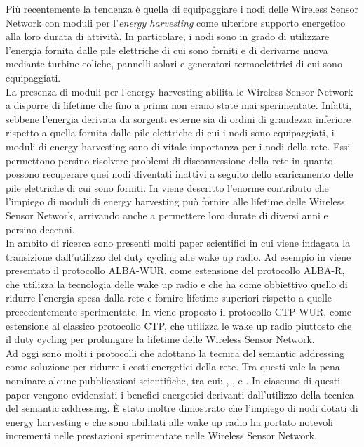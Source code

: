 \documentclass[binding=0.6cm,TFA]{sapthesis}
\begin{document}
Più recentemente la tendenza è quella di equipaggiare i nodi delle Wireless Sensor Network con moduli per l'\emph{energy harvesting} come ulteriore
supporto energetico alla loro durata di attività. In particolare, i nodi sono in grado di utilizzare l'energia fornita dalle pile elettriche di cui sono
forniti e di derivarne nuova mediante turbine eoliche, pannelli solari e generatori termoelettrici di cui sono equipaggiati.\\

\newpage
La presenza di moduli per l'energy harvesting abilita le Wireless Sensor Network a disporre di lifetime che fino a prima non erano state mai sperimentate.
Infatti, sebbene l'energia derivata da sorgenti esterne sia di ordini di grandezza inferiore rispetto a quella fornita dalle pile elettriche di cui i nodi sono
equipaggiati, i moduli di energy harvesting sono di vitale importanza per i nodi della rete. Essi permettono persino risolvere problemi di disconnessione
della rete in quanto possono recuperare quei nodi diventati inattivi a seguito dello scaricamento delle pile elettriche di cui sono forniti. In
\cite{wsn-energy-harvesting-paper} viene descritto l'enorme contributo che l'impiego di moduli di energy harvesting può fornire alle lifetime delle
Wireless Sensor Network, arrivando anche a permettere loro durate di diversi anni e persino decenni.\\

In ambito di ricerca sono presenti molti paper scientifici in cui viene indagata la transizione dall'utilizzo del duty cycling alle wake up radio. Ad esempio
in \cite{beyond-duty-cycling-paper} viene presentato il protocollo ALBA-WUR, come estensione del protocollo ALBA-R, che utilizza la tecnologia delle wake up radio
e che ha come obbiettivo quello di ridurre l'energia spesa dalla rete e fornire lifetime superiori rispetto a quelle precedentemente sperimentate. In
\cite{ctp-wur-paper} viene proposto il protocollo CTP-WUR, come estensione al classico protocollo CTP, che utilizza le wake up radio piuttosto che il
duty cycling per prolungare la lifetime delle Wireless Sensor Network.\\

Ad oggi sono molti i protocolli che adottano la tecnica del semantic addressing come soluzione per ridurre i costi energetici della rete. Tra questi
vale la pena nominare alcune pubblicazioni scientifiche, tra cui: \cite{novel-wake-up-receiver-paper}, \cite{beyond-duty-cycling-paper}, e \cite{ctp-wur-paper}.
In ciascuno di questi paper vengono evidenziati i benefici energetici derivanti dall'utilizzo della tecnica del semantic addressing. È stato inoltre
dimostrato che l'impiego di nodi dotati di energy harvesting \cite{energy-harvesting-paper} e che sono abilitati alle wake up radio
\cite{wake-up-radios-paper} ha portato notevoli incrementi nelle prestazioni sperimentate nelle Wireless Sensor Network.\\
\end{document}
